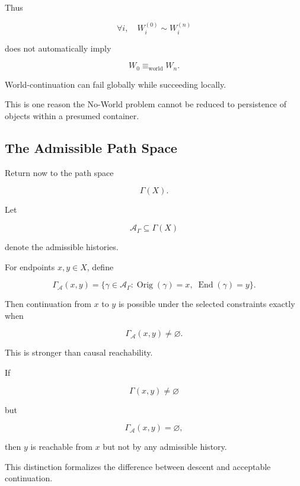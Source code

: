 \documentclass[
  11pt,
  a4paper,
  DIV=12,
  BCOR=0mm,
  parskip=half-
]{scrartcl}
\newcommand{\eqworld}{%
  \equiv_{\mathrm{world}}%
}
\newcommand{\End}{\operatorname{End}}
\newcommand{\Orig}{\operatorname{Orig}}
\theoremstyle{definition}
\theoremstyle{plain}
\theoremstyle{remark}
\begin{document}
Thus

\[
  \forall i,\quad
  W_i^{(0)}
  \sim
  W_i^{(n)}
\]

does not automatically imply

\[
  W_0\eqworld W_n.
\]

World-continuation can fail globally while succeeding locally.

This is one reason the No-World problem cannot be reduced to persistence of
objects within a presumed container.


\subsection{The Admissible Path Space}
\label{app:admissible-path-space}

Return now to the path space

\[
  \Gamma(X).
\]

Let

\[
  \mathcal A_\Gamma
  \subseteq
  \Gamma(X)
\]

denote the admissible histories.

For endpoints \(x,y\in X\), define

\[
  \Gamma_{\mathcal A}(x,y)
  =
  \{
    \gamma\in\mathcal A_\Gamma:
    \Orig(\gamma)=x,\;
    \End(\gamma)=y
  \}.
\]

Then continuation from \(x\) to \(y\) is possible under the selected
constraints exactly when

\[
  \Gamma_{\mathcal A}(x,y)\neq\varnothing.
\]

This is stronger than causal reachability.

If

\[
  \Gamma(x,y)\neq\varnothing
\]

but

\[
  \Gamma_{\mathcal A}(x,y)=\varnothing,
\]

then \(y\) is reachable from \(x\) but not by any admissible history.

This distinction formalizes the difference between descent and acceptable
continuation.

\end{document}
